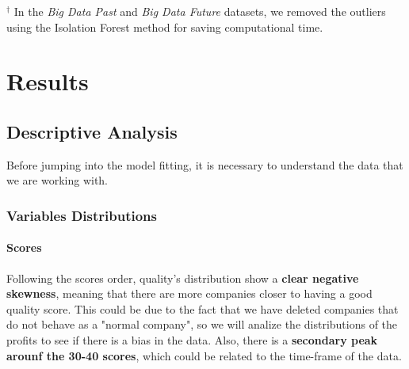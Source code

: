 \documentclass[11pt,english,a4paper,hidelinks]{book}
\begin{document}
\noindent $^\dagger$ In the \textit{Big Data Past} and \textit{Big Data Future} datasets, we removed the outliers using the Isolation Forest method for saving computational time.




\chapter{Results}
\section{Descriptive Analysis}

Before jumping into the model fitting, it is necessary to understand the data that we are working with.

\subsection{Variables Distributions}

\subsubsection{Scores}
Following the scores order, quality's distribution show a \textbf{clear negative skewness}, meaning that there are more companies closer to having a good quality score. This could be due to the fact that we have deleted companies that do not behave as a "normal company", so we will analize the distributions of the profits to see if there is a bias in the data. Also, there is a \textbf{secondary peak arounf the 30-40 scores}, which could be related to the time-frame of the data.
\end{document}
